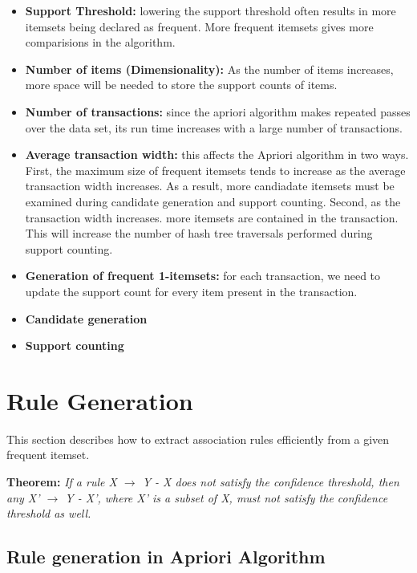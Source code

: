		\begin{itemize}
			\item {\bf Support Threshold:} lowering the support threshold often results in more
			itemsets being declared as frequent. More frequent itemsets gives more comparisions in
			the algorithm.
			\item {\bf Number of items (Dimensionality):} As the number of items increases, more
			space will be needed to store the support counts of items. 
			\item {\bf Number of transactions:} since the apriori algorithm makes repeated passes
			over the data set, its run time increases with a large number of transactions. 
			\item {\bf Average transaction width:} this affects the Apriori algorithm in two ways.
			First, the maximum  size of frequent itemsets tends to increase as the 
			average transaction width increases. As a result, more candiadate itemsets must be
			examined during candidate generation and support counting.
			Second, as the transaction width increases. more
			itemsets are contained in the transaction. This will increase the number of hash 
			tree traversals performed during support counting.
			\item {\bf Generation of frequent 1-itemsets:} for each transaction, we need to 
			update the support count for every item present in the transaction.
			\item {\bf Candidate generation} 
			\item {\bf Support counting} 
		\end{itemize}




	\clearpage
	\section{Rule Generation}

		This section describes how to extract association rules efficiently from a given 
		frequent itemset. 

		{\bf Theorem:} {\it If a rule X $\rightarrow$ Y - X does not satisfy the confidence
		threshold, then any X' $\rightarrow$ Y - X', where X' is a subset of X, must not satisfy
		the confidence threshold as well.}

		\subsection*{Rule generation in Apriori Algorithm}

